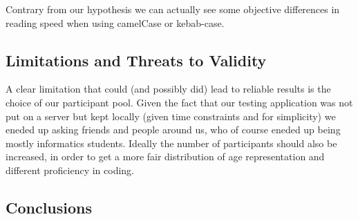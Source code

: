 \documentclass{article}
\begin{document}
Contrary from our hypothesis we can actually see some objective differences in reading speed when using camelCase or kebab-case.

\subsection{Limitations and Threats to Validity}
A clear limitation that could (and possibly did) lead to reliable results is the choice of our participant pool. Given the fact that our testing application 
was not put on a server but kept locally (given time constraints and for simplicity) we eneded up asking friends and people around us, who of course eneded up being 
mostly informatics students. Ideally the number of participants should also be increased, in order to get a more fair distribution of age representation and different 
proficiency in coding.

\subsection{Conclusions}
\end{document}
